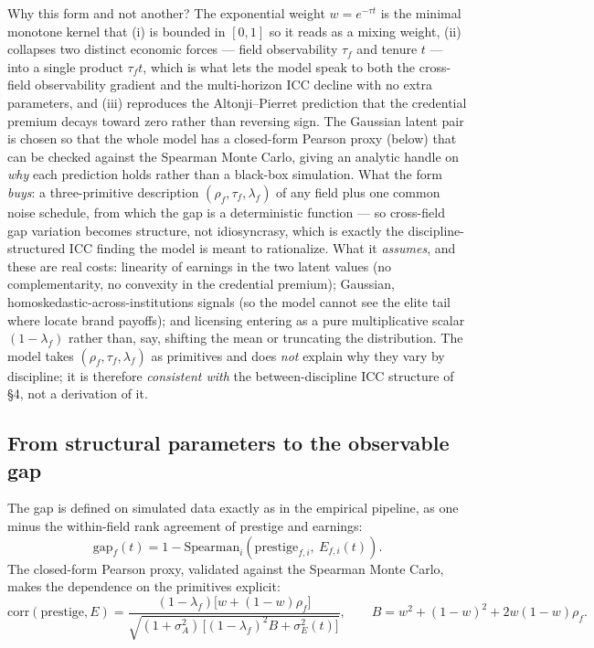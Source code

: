 \documentclass[11pt]{article}
\begin{document}
Why this form and not another? The exponential weight $w=e^{-\tau t}$ is the minimal monotone kernel that (i) is bounded in $[0,1]$ so it reads as a mixing weight, (ii) collapses two distinct economic forces --- field observability $\tau_f$ and tenure $t$ --- into a single product $\tau_f t$, which is what lets the model speak to both the cross-field observability gradient and the multi-horizon ICC decline with no extra parameters, and (iii) reproduces the Altonji--Pierret prediction that the credential premium decays toward zero rather than reversing sign. The Gaussian latent pair is chosen so that the whole model has a closed-form Pearson proxy (below) that can be checked against the Spearman Monte Carlo, giving an analytic handle on \emph{why} each prediction holds rather than a black-box simulation. What the form \emph{buys}: a three-primitive description $(\rho_f,\tau_f,\lambda_f)$ of any field plus one common noise schedule, from which the gap is a deterministic function --- so cross-field gap variation becomes structure, not idiosyncrasy, which is exactly the discipline-structured ICC finding the model is meant to rationalize. What it \emph{assumes}, and these are real costs: linearity of earnings in the two latent values (no complementarity, no convexity in the credential premium); Gaussian, homoskedastic-across-institutions signals (so the model cannot see the elite tail where \citet{chetty2023diversifying} locate brand payoffs); and licensing entering as a pure multiplicative scalar $(1-\lambda_f)$ rather than, say, shifting the mean or truncating the distribution. The model takes $(\rho_f,\tau_f,\lambda_f)$ as primitives and does \emph{not} explain why they vary by discipline; it is therefore \emph{consistent with} the between-discipline ICC structure of \S4, not a derivation of it.

\subsection{From structural parameters to the observable gap}

The gap is defined on simulated data exactly as in the empirical pipeline, as one minus the within-field rank agreement of prestige and earnings:
\[
\mathrm{gap}_f(t) = 1 - \mathrm{Spearman}_i\!\left(\mathrm{prestige}_{f,i},\ E_{f,i}(t)\right).
\]
The closed-form Pearson proxy, validated against the Spearman Monte Carlo, makes the dependence on the primitives explicit:
\[
\mathrm{corr}(\mathrm{prestige},E) = \frac{(1-\lambda_f)\big[w + (1-w)\rho_f\big]}{\sqrt{(1+\sigma_A^2)\,\big[(1-\lambda_f)^2 B + \sigma_E^2(t)\big]}},
\qquad B = w^2 + (1-w)^2 + 2w(1-w)\rho_f.
\]
\end{document}
